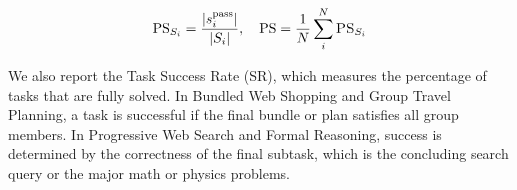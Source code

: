 
\begin{align}
    \text{PS}_{S_i}=  \frac{{|s_i^\text{pass}|}}{|S_i|}, \quad\text{PS} = \frac{1}{N}\sum_i^N \textsc{PS}_{S_i}
\end{align}

We also report the Task Success Rate (SR), which measures the percentage of tasks that are fully solved. In Bundled Web Shopping and Group Travel Planning, a task is successful if the final bundle or plan satisfies all group members. In Progressive Web Search and Formal Reasoning, success is determined by the correctness of the final subtask, which is the concluding search query or the major math or physics problems.








